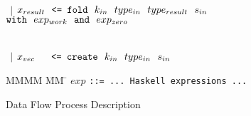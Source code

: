 \begin{figure}
\begin{tabbing}
 \\[1ex]
 \> $~~|$ \> $x_{result}~~  
                        \tt{<= fold}~~ k_{in}~~ type_{in}~~ type_{result}~~ s_{in}$ \\
 \>       \> \> $\tt{with}   ~~ exp_{work}
                  ~~    \tt{and}    ~~ exp_{zero}$

 \\[1ex]
 \> $~~|$ \> $x_{vec}~~~~~
                        \tt{<= create}~~ k_{in}~~ type_{in}~~ s_{in}$
\end{tabbing}

\begin{tabbing}
MMMM           \= MM \= \kill
$exp$   
 \> \tt{::=} \>  ... Haskell expressions ...
\end{tabbing} 
\caption{Data Flow Process Description}
\label{f:Process}
\end{figure}
